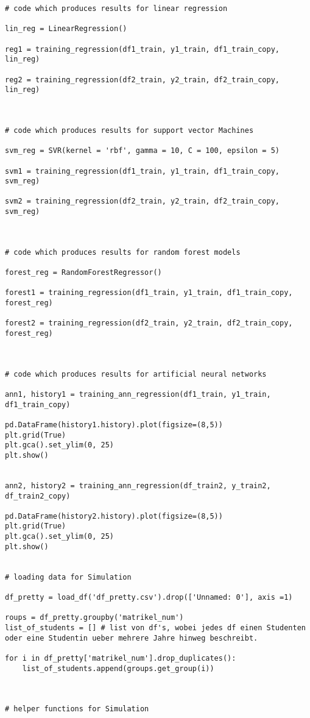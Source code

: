 \begin{lstlisting}
# code which produces results for linear regression

lin_reg = LinearRegression()

reg1 = training_regression(df1_train, y1_train, df1_train_copy, lin_reg)

reg2 = training_regression(df2_train, y2_train, df2_train_copy, lin_reg)



# code which produces results for support vector Machines

svm_reg = SVR(kernel = 'rbf', gamma = 10, C = 100, epsilon = 5)

svm1 = training_regression(df1_train, y1_train, df1_train_copy, svm_reg)

svm2 = training_regression(df2_train, y2_train, df2_train_copy, svm_reg)



# code which produces results for random forest models 

forest_reg = RandomForestRegressor()

forest1 = training_regression(df1_train, y1_train, df1_train_copy, forest_reg)

forest2 = training_regression(df2_train, y2_train, df2_train_copy, forest_reg)



# code which produces results for artificial neural networks

ann1, history1 = training_ann_regression(df1_train, y1_train, df1_train_copy)

pd.DataFrame(history1.history).plot(figsize=(8,5))
plt.grid(True)
plt.gca().set_ylim(0, 25)
plt.show()


ann2, history2 = training_ann_regression(df_train2, y_train2, df_train2_copy)

pd.DataFrame(history2.history).plot(figsize=(8,5))
plt.grid(True)
plt.gca().set_ylim(0, 25)
plt.show()


# loading data for Simulation

df_pretty = load_df('df_pretty.csv').drop(['Unnamed: 0'], axis =1)

roups = df_pretty.groupby('matrikel_num')
list_of_students = [] # list von df's, wobei jedes df einen Studenten oder eine Studentin ueber mehrere Jahre hinweg beschreibt.

for i in df_pretty['matrikel_num'].drop_duplicates():
    list_of_students.append(groups.get_group(i))



# helper functions for Simulation


\end{lstlisting}
